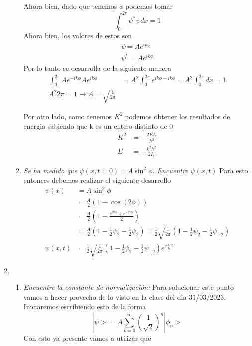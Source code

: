 \documentclass[12pt]{exam}
\begin{document}
\begin{enumerate}
\begin{enumerate}
				Ahora bien, dado que tenemos $\phi$ podemos tomar
				\[\int_{0}^{2\pi}\psi^{*}\psi dx=1\]
				Ahora bien, los valores de estos son
				\begin{align*}
				  \psi = Ae^{ik\phi}\\
				  \psi^{*} = Ae^{ik\phi}
				\end{align*}
				Por lo tanto se desarrolla de la siguiente manera
				\begin{align*}
				  \int_{0}^{2\pi}Ae^{-ik\phi}Ae^{ik\phi}&=A^{2}\int_{0}^{2\pi}e^{ik\phi-ik\phi}=A^{2}\int_{0}^{2\pi}dx=1\\
				  A^{2}2\pi = 1 \rightarrow A =\sqrt{\frac{1}{2\pi}}
				\end{align*}

				Por otro lado, como tenemos $K^{2}$ podemos obtener los resultados de energia sabiendo que k es un entero distinto de 0
				\begin{align*}
				  K^{2}&=-\frac{2EI_{z}}{\hbar^{2}}\\
				  E &=-\frac{k^{2}\hbar^{2}}{2I_{z}}
				\end{align*}
		  \item \textit{Se ha medido que $\psi(x,t=0)=A\sin^{2}\phi$. Encuentre $\psi(x,t)$}
				Para esto entonces debemos realizar el siguiente desarrollo
				\begin{align*}
				  \psi(x)&=A\sin^{2}\phi\\
						 &=\frac{A}{2}(1-\cos(2\phi))\\
						 &= \frac{A}{2}(1-\frac{e^{2i\phi}+e^{-2i\phi}}{2})\\
						 &= \frac{A}{2}(1-\frac{1}{2}\psi_{2}-\frac{1}{2}\psi_{2})=\frac{1}{2}\sqrt{\frac{1}{2\pi}}(1-\frac{1}{2}\psi_{2}-\frac{1}{2}\psi_{-2})\\
				  \psi(x,t) &= \frac{1}{2}\sqrt{\frac{1}{2\pi}}(1-\frac{1}{2}\psi_{2}-\frac{1}{2}\psi_{-2})e^{\frac{-iEt}{\hbar}}
				\end{align*}
		\end{enumerate}
  \item \begin{enumerate}
		  \item \textit{Encuentre la constante de normalización:}
				Para solucionar este punto vamos a hacer provecho de lo visto en la clase del dia 31/03/2023. Iniciaremos escribiendo esto de la forma
				\begin{equation*}
				  | \psi > = A\sum_{n=0}^{\infty}{\left(\frac{1}{\sqrt{2}}\right)}^{n} |\phi_{n}>
				\end{equation*}
				Con esto ya presente vamos a utilizar que

\end{enumerate}
\end{enumerate}
\end{document}
